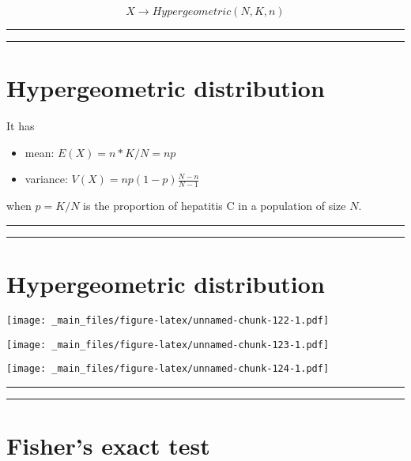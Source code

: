 \documentclass[
]{book}
\begin{document}
\[X \rightarrow Hypergeometric(N,K,n)\]

\begin{center}\rule{0.5\linewidth}{0.5pt}\end{center}

\begin{center}\rule{0.5\linewidth}{0.5pt}\end{center}

\hypertarget{hypergeometric-distribution-1}{%
\section{Hypergeometric distribution}\label{hypergeometric-distribution-1}}

It has

\begin{itemize}
\item
  mean: \(E (X) = n * K / N = np\)
\item
  variance: \(V(X) = np (1-p)\frac{N-n}{N-1}\)
\end{itemize}

when \(p=K/N\) is the proportion of hepatitis C in a population of size \(N\).

\begin{center}\rule{0.5\linewidth}{0.5pt}\end{center}

\begin{center}\rule{0.5\linewidth}{0.5pt}\end{center}

\hypertarget{hypergeometric-distribution-2}{%
\section{Hypergeometric distribution}\label{hypergeometric-distribution-2}}

\texttt{[image: \_main\_files/figure-latex/unnamed-chunk-122-1.pdf]}

\texttt{[image: \_main\_files/figure-latex/unnamed-chunk-123-1.pdf]}

\texttt{[image: \_main\_files/figure-latex/unnamed-chunk-124-1.pdf]}

\begin{center}\rule{0.5\linewidth}{0.5pt}\end{center}

\begin{center}\rule{0.5\linewidth}{0.5pt}\end{center}

\hypertarget{fishers-exact-test-2}{%
\section{Fisher's exact test}\label{fishers-exact-test-2}}
\end{document}
